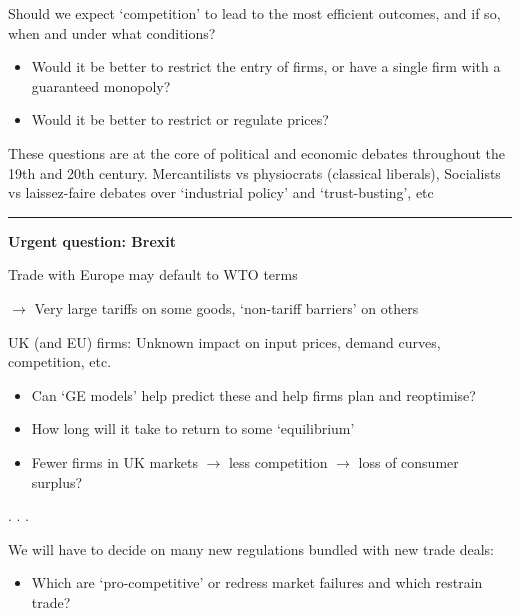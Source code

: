 \documentclass[]{article}
\providecommand{\tightlist}{%
  \setlength{\itemsep}{0pt}\setlength{\parskip}{0pt}}
\begin{document}
Should we expect `competition' to lead to the most efficient outcomes,
and if so, when and under what conditions?

\begin{itemize}
\item
  Would it be better to restrict the entry of firms, or have a single
  firm with a guaranteed monopoly?
\item
  Would it be better to restrict or regulate prices?
\end{itemize}

These questions are at the core of political and economic debates
throughout the 19th and 20th century. Mercantilists vs physiocrats
(classical liberals), Socialists vs laissez-faire debates over
`industrial policy' and `trust-busting', etc

\begin{center}\rule{0.5\linewidth}{\linethickness}\end{center}

\textbf{Urgent question: Brexit}

\bigskip

Trade with Europe may default to WTO terms

\bigskip

\(\rightarrow\) Very large tariffs on some goods, `non-tariff barriers'
on others

\bigskip

UK (and EU) firms: Unknown impact on input prices, demand curves,
competition, etc.

\begin{itemize}
\item
  Can `GE models' help predict these and help firms plan and reoptimise?
\item
  How long will it take to return to some `equilibrium'
\end{itemize}

\bigskip

\begin{itemize}
\tightlist
\item
  Fewer firms in UK markets \(\rightarrow\) less competition
  \(\rightarrow\) loss of consumer surplus?
\end{itemize}

. . .

We will have to decide on many new regulations bundled with new trade
deals:

\begin{itemize}
\tightlist
\item
  Which are `pro-competitive' or redress market failures and which
  restrain trade?
\end{itemize}
\end{document}
